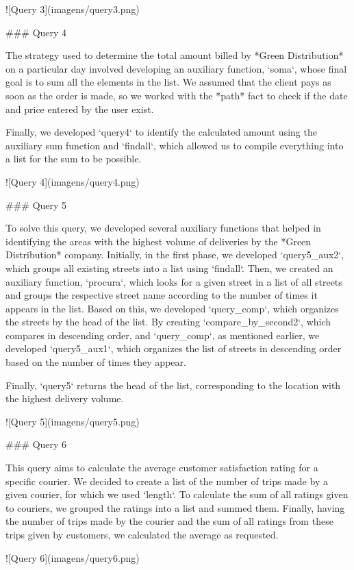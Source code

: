 ![Query 3](imagens/query3.png)

### Query 4

The strategy used to determine the total amount billed by *Green Distribution* on a particular day involved developing an auxiliary function, `soma`, whose final goal is to sum all the elements in the list. We assumed that the client pays as soon as the order is made, so we worked with the *path* fact to check if the date and price entered by the user exist.

Finally, we developed `query4` to identify the calculated amount using the auxiliary sum function and `findall`, which allowed us to compile everything into a list for the sum to be possible.

![Query 4](imagens/query4.png)

### Query 5

To solve this query, we developed several auxiliary functions that helped in identifying the areas with the highest volume of deliveries by the *Green Distribution* company. Initially, in the first phase, we developed `query5_aux2`, which groups all existing streets into a list using `findall`. Then, we created an auxiliary function, `procura`, which looks for a given street in a list of all streets and groups the respective street name according to the number of times it appears in the list. Based on this, we developed `query_comp`, which organizes the streets by the head of the list. By creating `compare_by_second2`, which compares in descending order, and `query_comp`, as mentioned earlier, we developed `query5_aux1`, which organizes the list of streets in descending order based on the number of times they appear.

Finally, `query5` returns the head of the list, corresponding to the location with the highest delivery volume.

![Query 5](imagens/query5.png)

### Query 6

This query aims to calculate the average customer satisfaction rating for a specific courier. We decided to create a list of the number of trips made by a given courier, for which we used `length`. To calculate the sum of all ratings given to couriers, we grouped the ratings into a list and summed them. Finally, having the number of trips made by the courier and the sum of all ratings from these trips given by customers, we calculated the average as requested.

![Query 6](imagens/query6.png)

